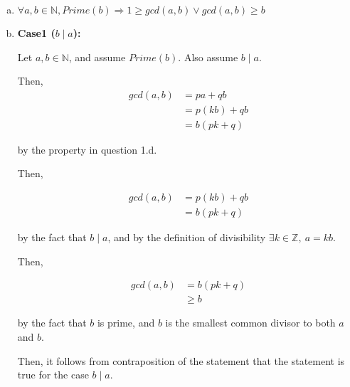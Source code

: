 \documentclass[12pt]{article}
\begin{document}
\begin{enumerate}[a.]
    \item

    $\forall a,b \in \mathbb{N}, Prime(b) \Rightarrow 1 \geq gcd(a,b) \lor gcd(a,b) \geq b$

    \item

    \textbf{Case1 ($b \mid a$):}

    \bigskip

    Let $a,b \in \mathbb{N}$, and assume $Prime(b)$. Also assume $b \mid a$.

    \bigskip

    Then,
    \setcounter{equation}{0}
    \begin{align}
        gcd(a,b) &= pa + qb\\
        &= p(kb) + qb\\
        &= b(pk + q)
    \end{align}


    by the property in question 1.d.

    \bigskip

    Then,


    \begin{align}
        gcd(a,b) &= p(kb) + qb\\
        &= b(pk + q)
    \end{align}

    by the fact that $b \mid a$, and by the definition of divisibility $\exists
    k \in \mathbb{Z},\:a = kb$.

    \bigskip

    Then,

    \begin{align}
        gcd(a,b) &= b(pk + q)\\
        &\geq b
    \end{align}

    by the fact that $b$ is prime, and $b$ is the smallest common divisor to both $a$ and $b$.

    \bigskip

    Then, it follows from contraposition of the statement that the statement is true for
    the case $b \mid a$.

\end{enumerate}
\end{document}

